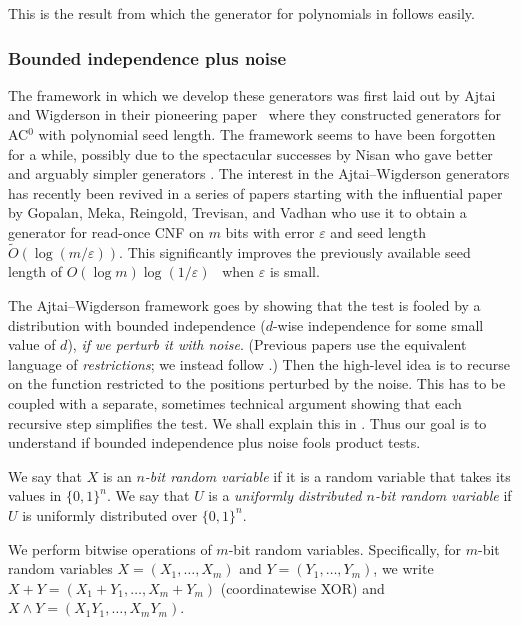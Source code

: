 \documentclass{toc}
\newcommand{\zo}{\{0,1\}}
\def\eps{\varepsilon}
\begin{document}
This is the result from which the generator for polynomials in  follows easily.

\subsubsection{Bounded independence plus noise}
%
The framework in which we develop these generators was first laid out by
Ajtai and Wigderson in their pioneering
%
paper~\cite{AjtaiW89} where they constructed  %
generators for AC$^0$ with polynomial seed length.  The framework
seems to have been forgotten for a while, possibly due to the spectacular
successes by Nisan who gave better and arguably simpler generators
\cite{Nisan91,Nisan92}.  %
The interest in the Ajtai--Wigderson generators has recently been revived %
in a series of papers starting with the
%
influential paper \cite{GopalanMRTV12}  %
by Gopalan, Meka, Reingold, Trevisan, and Vadhan %
who use it to obtain a generator for
read-once CNF on $m$ bits with error $\eps$ and seed length
$\tilde O(\log(m/\eps))$. This significantly improves
%
the previously available seed length of
$O(\log m) \log(1/\eps)$~\cite{ChariRS00,DeETT10} when $\eps$ is small.

The Ajtai--Wigderson framework goes by showing that the test is fooled by
a distribution with 
%
bounded  %
%
%
%
%
independence \cite{NaorN93}
%
($d$-wise independence for some small value of $d$),   %
\emph{if we perturb it with noise}.
%
%
%
%
%
%
%
%
%
%
%
%
%
%
(Previous papers use the equivalent language of
\emph{restrictions}; %
we instead follow \cite{HaramatyLV-bipnfp}.)  Then the
high-level idea is to recurse on the
function restricted to the  %
positions perturbed by the  %
noise.
%
%
%
This has to be coupled with a
separate, sometimes technical argument showing that each
%
recursive step  %
%
simplifies the test. %
%
%
%
We shall explain this
in .  %
Thus our goal is to understand if bounded independence plus noise
%
%
fools product tests.
%
%
%
%
%
%
%
%
%

We say that $X$ is an \emph{$n$-bit random variable} if it is a
random variable that takes its values in $\zo^n$.
We say that $U$ is a \emph{uniformly distributed $n$-bit
random variable} if $U$ is uniformly distributed over $\zo^n$.

%
%
We perform bitwise operations of $m$-bit random variables.
Specifically, for $m$-bit random variables $X=(X_1,\dots,X_m)$ and
$Y=(Y_1,\dots,Y_m)$, we write $X+Y=(X_1+Y_1,\dots,X_m+Y_m)$
(coordinatewise XOR) and $X\wedge Y=(X_1Y_1,\dots,X_mY_m)$.
%
%
%
%
\end{document}
